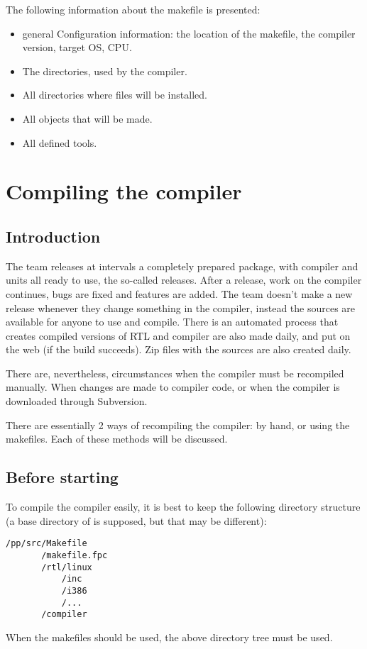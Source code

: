 The following information about the makefile is presented:
\begin{itemize}
\item general Configuration information: the location of
the makefile, the compiler version, target OS, CPU.
\item The directories, used by the compiler.
\item All directories where files will be installed.
\item All objects that will be made.
\item All defined tools.
\end{itemize}


\chapter{Compiling the compiler}
\label{ch:AppF}

\section{Introduction}

The \fpc team releases at intervals a completely prepared package, with
compiler and units all ready to use, the so-called releases.  After a
release, work on the compiler continues, bugs are fixed and features are
added. The \fpc team doesn't make a new release whenever they change
something in the compiler, instead the sources are available for anyone to
use and compile. There is an automated process that creates compiled 
versions of RTL and compiler are also made daily, and put on the web (if the
build succeeds). Zip files with the sources are also created daily.

There are, nevertheless, circumstances when the compiler must be recompiled
manually. When changes are made to compiler code, or when the compiler is
downloaded through Subversion.

There are essentially 2 ways of recompiling the compiler: by hand, or using
the makefiles. Each of these methods will be discussed.

\section{Before starting}

To compile the compiler easily, it is best to keep the following directory
structure (a base directory of  is supposed, but that may be
different):
\begin{verbatim}
/pp/src/Makefile
       /makefile.fpc
       /rtl/linux
           /inc
           /i386
           /...
       /compiler
\end{verbatim}
When the makefiles should be used, the above directory tree must be used.

